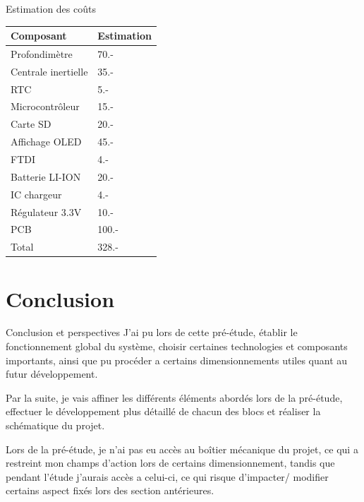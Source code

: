 \documentclass[compress,aspectratio=169]{beamer}
\begin{document}
\begin{frame}[containsverbatim]{Estimation des coûts}
	\begin{center}
		\begin{tabular}{l|l}
			Composant & Estimation \\
			\hline
			Profondimètre & 70.- \\
			Centrale inertielle & 35.- \\
			RTC & 5.- \\
			Microcontrôleur & 15.- \\
			Carte SD & 20.- \\
			Affichage OLED & 45.- \\
			FTDI & 4.- \\
			Batterie LI-ION & 20.- \\
			IC chargeur & 4.- \\
			Régulateur 3.3V & 10.- \\
			PCB & 100.- \\
			\hline
			\hline
			\vspace{+5pt}Total & 328.-
		\end{tabular} 
	\end{center}
\end{frame}

\section{Conclusion}

\begin{frame}[containsverbatim]{Conclusion et perspectives}
	J’ai pu lors de cette pré-étude, établir le fonctionnement global du système,
	choisir certaines technologies et composants importants, ainsi que
	pu procéder a certains dimensionnements utiles quant au futur développement.
	
	
	Par la suite, je vais affiner les différents éléments abordés lors de la
	pré-étude, effectuer le développement plus détaillé de chacun des blocs et
	réaliser la schématique du projet.
	
	
	Lors de la pré-étude, je n’ai pas eu accès au boîtier mécanique du projet,
	ce qui a restreint mon champs d’action lors de certains dimensionnement,
	tandis que pendant l’étude j’aurais accès a celui-ci, ce qui risque d’impacter/
	modifier certains aspect fixés lors des section antérieures.
\end{frame}
\end{document}
